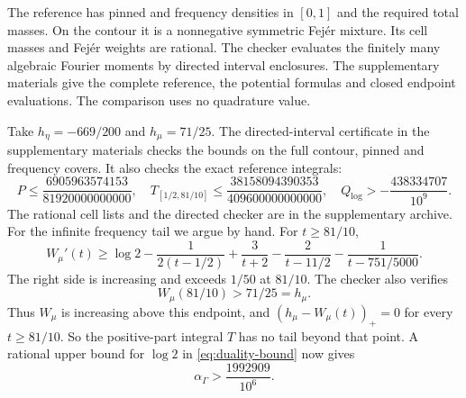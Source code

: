 The reference has pinned and frequency densities in $[0,1]$ and the
required total masses. On the contour it is a nonnegative symmetric
Fej\'er mixture. Its cell masses and Fej\'er weights are rational. The
checker evaluates the finitely many algebraic Fourier moments by directed
interval enclosures. The supplementary materials give the complete
reference, the potential formulas and closed endpoint evaluations. The
comparison uses no quadrature value.

Take $h_\eta=-669/200$ and $h_\mu=71/25$. The directed-interval
certificate in the supplementary materials checks the bounds on the full
contour, pinned and frequency covers. It also checks the exact reference
integrals:
\[
P\le\frac{6905963574153}{81920000000000},\quad
T_{[1/2,81/10]}\le\frac{38158094390353}{409600000000000},\quad
Q_{\log}>-\frac{438334707}{10^9}.
\]
The rational cell lists and the directed checker are in the supplementary
archive. For the infinite frequency tail we argue by hand. For
$t\ge81/10$,
\[
W_\mu'(t)\ge\log2-\frac1{2(t-1/2)}+\frac3{t+2}
 -\frac2{t-11/2}-\frac1{t-751/5000}.
\]
The right side is increasing and exceeds $1/50$ at $81/10$. The checker
also verifies
\[
W_\mu(81/10)>71/25=h_\mu.
\]
Thus $W_\mu$ is increasing above this endpoint, and
$(h_\mu-W_\mu(t))_+=0$ for every $t\ge81/10$. So the positive-part
integral $T$ has no tail beyond that point. A rational upper bound for
$\log2$ in \eqref{eq:duality-bound} now gives
\begin{equation}
\alpha_\Gamma>\frac{1992909}{10^6}.
\label{eq:alpha-lower}
\end{equation}

